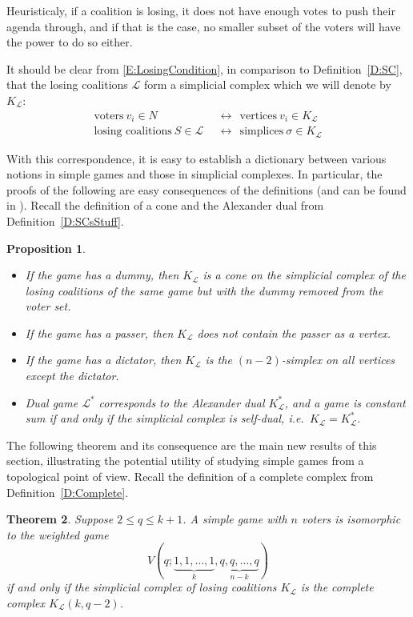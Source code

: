 \documentclass[11pt]{amsart}
\theoremstyle{plain}
\newtheorem{thm}{Theorem}[section]
\newtheorem{prop}[thm]{Proposition}
\theoremstyle{definition}
\theoremstyle{remark}
\newcommand{\refD}[1]{Definition~\ref{D:#1}}
\begin{document}
Heuristicaly, if a coalition is losing, it does not have enough votes to push their agenda through, and if that is the case, no smaller subset of the voters will have the power to do so either.


It should be clear from \eqref{E:LosingCondition}, in comparison to \refD{SC}, that the losing coalitions $\mathcal L$ form a simplicial complex which we will denote by $K_{\mathcal L}$:
\begin{align*}
\text{voters}\  v_i\in N\ \ & \longleftrightarrow\ \    \text{vertices}\  v_i\in K_{\mathcal L} \\
\text{losing coalitions}\  S\in \mathcal L \ \ & \longleftrightarrow\ \  \text{simplices}\  \sigma\in K_{\mathcal L}
\end{align*}


With this correspondence, it is easy to establish a dictionary between various notions in simple games and those in simplicial complexes. In particular, the proofs of the following are easy consequences of the definitions (and can be found in \cite[Propositions 4.1 and 4.4]{VV:SimpleGames}). Recall the definition of a cone and the Alexander dual from \refD{SCsStuff}.

\begin{prop}\label{P:Games<->SCs} \ 
\begin{itemize}
\item If the game has a dummy, then $K_{\mathcal L}$ is a cone on the simplicial complex of the losing coalitions of the same game but with the dummy removed from the voter set.
\item If the game has a passer, then $K_{\mathcal L}$ does not contain the passer as a vertex.
\item If the game has a dictator, then $K_{\mathcal L}$ is the $(n-2)$-simplex on all vertices except the dictator.
\item Dual game $\mathcal L^*$ corresponds to the Alexander dual $K_{\mathcal L}^*$, and a game is constant sum if and only if the simplicial complex is self-dual, i.e.~$K_{\mathcal L}=K_{\mathcal L}^*$. 
\end{itemize}
\end{prop}

The following theorem and its consequence are the main new results of this section, illustrating the potential utility of studying simple games from a topological point of view. Recall the definition of a complete complex from \refD{Complete}.

\begin{thm}\label{T:CompleteWeightedGames}
Suppose $2\leq q\leq k+1$. 
A simple game with $n$ voters is isomorphic to the weighted game
\begin{equation}\label{E:WeightedComplete}
V(q;\underbrace{1,1,\dots,1}_{k},\underbrace{q,q,\dots,q}_{n-k})
\end{equation}
if and only if the simplicial complex of losing coalitions $K_{\mathcal L}$ is the complete complex $K_{\mathcal L}(k,q-2)$.
\end{thm}
\end{document}
